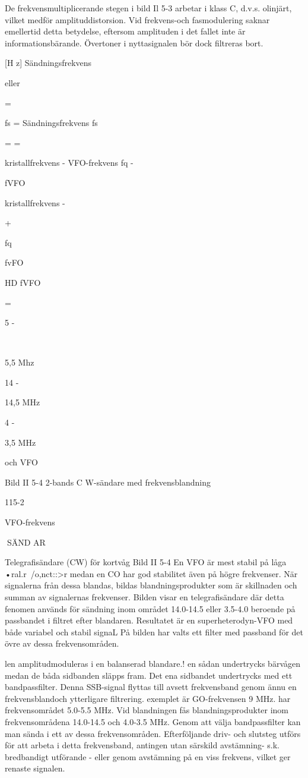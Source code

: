\documentclass[a4paper,twoside,twocolumn,openright]{book}
\begin{document}
{{{De frekvensmultiplicerande stegen i bild
Il 5-3 arbetar i klass C, d.v.s. olinjärt, vilket
medför amplituddistorsion. Vid frekvens-och
fasmodulering saknar emellertid detta betydelse, eftersom amplituden i det fallet inte är
informationsbärande. Övertoner i nyttasignalen bör dock filtreras bort.

[H z]
Sändningsfrekvens

eller

=

fs =
Sändningsfrekvens
fs

=
=

kristallfrekvens - VFO-frekvens
fq -

fVFO

kristallfrekvens -

+

fq

fvFO

HD
fVFO

=

5 -

\

5,5 Mhz

14 -

14,5 MHz

4 -

3,5 MHz

och
VFO

Bild II 5-4 2-bands C W-sändare med frekvensblandning

115-2

VFO-frekvens

SÄND AR

Telegrafisändare (CW) för kortvåg
Bild II 5-4
En VFO är mest stabil på låga •ral.r\ /o,nct::>r
medan en CO har god stabilitet även på
högre frekvenser. När signalerna från dessa
blandas, bildas blandningsprodukter som är
skillnaden och summan av signalernas frekvenser. Bilden visar en telegrafisändare där
detta fenomen används för sändning inom
området 14.0-14.5 eller 3.5-4.0
beroende på passbandet i filtret efter blandaren.
Resultatet är en superheterodyn-VFO
med både variabel och stabil signaL På
bilden har valts ett filter med passband för
det övre av dessa frekvensområden.

len amplitudmoduleras i en balanserad blandare.! en sådan undertrycks bärvågen medan de båda sidbanden släpps fram. Det ena
sidbandet undertrycks med ett bandpassfilter. Denna SSB-signal flyttas till avsett frekvensband genom ännu en frekvensblandoch ytterligare filtrering.
exemplet är GO-frekvensen 9 MHz.
har frekvensområdet 5.0-5.5 MHz. Vid
blandningen fås blandningsprodukter inom
frekvensområdena 14.0-14.5 och 4.0-3.5
MHz. Genom att välja bandpassfilter kan
man sända i ett av dessa frekvensområden.
Efterföljande driv- och slutsteg utförs för
att arbeta i detta frekvensband, antingen
utan särskild avstämning- s.k. bredbandigt
utförande - eller genom avstämning på en
viss frekvens, vilket ger renaste signalen.

}}}
\end{document}
